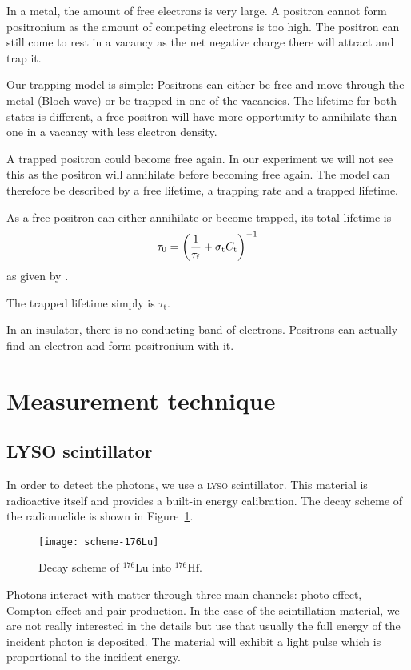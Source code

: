 \documentclass[11pt, english, fleqn, DIV=15, headinclude, BCOR=2cm]{scrreprt}
\begin{document}
In a metal, the amount of free electrons is very large. A positron cannot form
positronium as the amount of competing electrons is too high. The positron can
still come to rest in a vacancy as the net negative charge there will attract
and trap it.

Our trapping model is simple: Positrons can either be free and move through the
metal (Bloch wave) or be trapped in one of the vacancies. The lifetime for both
states is different, a free positron will have more opportunity to annihilate
than one in a vacancy with less electron density.

A trapped positron could become free again. In our experiment we will not see
this as the positron will annihilate before becoming free again. The model can
therefore be described by a free lifetime, a trapping rate and a trapped
lifetime.

As a free positron can either annihilate or become trapped, its total lifetime
is
\[
    \tau_0 = \left( \frac{1}{\tau_\mathrm f} + \sigma_\mathrm t C_\mathrm t \right)^{-1}
\]
as given by \textcite[(1a)]{Weiler/Vacancy_formation}.

The trapped lifetime simply is $\tau_\mathrm t$.

In an insulator, there is no conducting band of electrons. Positrons can
actually find an electron and form positronium with it. 

\section{Measurement technique}

\subsection{LYSO scintillator}

In order to detect the photons, we use a \textsc{lyso} scintillator. This material is
radioactive itself and provides a built-in energy calibration. The decay scheme
of the radionuclide is shown in Figure~\ref{fig:scheme-176Lu}.

\begin{figure}
    \centering
    \texttt{[image: scheme-176Lu]}
    \caption{%
        Decay scheme of $^{176}\mathrm{Lu}$ into $^{176}\mathrm{Hf}$.
    }
    \label{fig:scheme-176Lu}
\end{figure}

Photons interact with matter through three main channels: photo effect, Compton
effect and pair production. In the case of the scintillation material, we are
not really interested in the details but use that usually the full energy of
the incident photon is deposited. The material will exhibit a light pulse which
is proportional to the incident energy.
\end{document}
